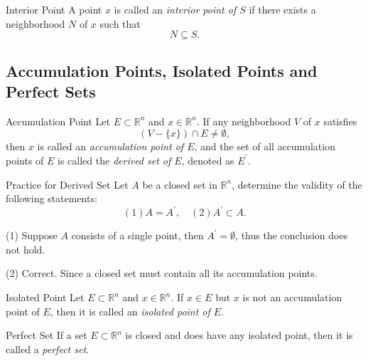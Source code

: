 \begin{definition}{Interior Point}{}
  A point $x$ is called an \emph{interior point of $S$} if there exists a
  neighborhood $N$ of $x$ such that
  \begin{equation}
    N \subseteq S.
  \end{equation}
\end{definition}




\subsection{Accumulation Points, Isolated Points and Perfect Sets}

\begin{definition}{Accumulation Point}{}
  Let $E \subset \mathbb{R}^n$ and $x \in \mathbb{R}^n$.
  If any neighborhood $V$ of $x$ satisfies
  \begin{equation}
    (V - \{x\}) \cap E \neq \emptyset,
  \end{equation}
  then $x$ is called an \emph{accumulation point of $E$},
  and the set of all accumulation points of $E$ is called the \emph{derived set
    of $E$}, denoted as $E^{\prime}$.
\end{definition}

\begin{example}{Practice for Derived Set}{}
  Let $A$ be a closed set in $\mathbb{R}^n$,
  determine the validity of the following statements:
  \begin{equation}
    (1) A = A^{\prime}, \quad
    (2) A^{\prime} \subset A.
  \end{equation}
\end{example}

\begin{solution}
  (1) Suppose $A$ consists of a single point,
  then $A^{\prime} = \emptyset$, thus the conclusion does not hold.

  (2) Correct. Since a closed set must contain all its accumulation points.
\end{solution}

\begin{definition}{Isolated Point}{}
  Let $E \subset \mathbb{R}^n$ and $x \in \mathbb{R}^n$.
  If $x \in E$ but $x$ is not an accumulation point of $E$,
  then it is called an \emph{isolated point of $E$}.
\end{definition}

\begin{definition}{Perfect Set}{}
  If a set $E \subset \mathbb{R}^n$ is closed and does have any isolated point,
  then it is called a \emph{perfect set}.
\end{definition}



